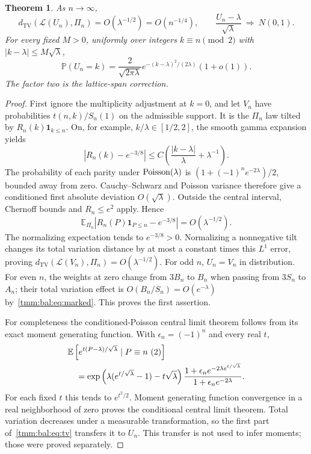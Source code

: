 \documentclass[11pt,letterpaper]{article}
\newtheorem{theorem}{Theorem}[section]
\theoremstyle{remark}\newtheorem{remark}[theorem]{Remark}
\newcommand{\E}{\mathbb E}\newcommand{\Pp}{\mathbb P}
\newcommand{\one}{\mathbf 1}\newcommand{\TV}{d_{\mathrm{TV}}}
\begin{document}
\begin{theorem}\label{tmm:bal:thm:tv}
As $n\to\infty$,
\begin{equation}\label{tmm:bal:eq:tv}
 \TV(\mathcal L(U_n),\Pi_n)=O(\lambda^{-1/2})=O(n^{-1/4}),
 \qquad \frac{U_n-\lambda}{\sqrt\lambda}\ \Longrightarrow\ N(0,1).
\end{equation}
For every fixed $M>0$, uniformly over integers $k\equiv n\pmod2$ with $|k-\lambda|\le M\sqrt\lambda$,
\begin{equation}\label{tmm:bal:eq:local}
 \Pp(U_n=k)=\frac{2}{\sqrt{2\pi\lambda}}
 e^{-(k-\lambda)^2/(2\lambda)}(1+o(1)).
\end{equation}
The factor two is the lattice-span correction.
\end{theorem}
\begin{proof}
First ignore the multiplicity adjustment at $k=0$, and let $V_n$ have probabilities $t(n,k)/S_n(1)$ on the admissible support. It is the $\Pi_n$ law tilted by $R_n(k)\one_{k\le n}$. On, for example, $k/\lambda\in[1/2,2]$, the smooth gamma expansion yields
\[
 |R_n(k)-e^{-3/8}|
   \le C\left(\frac{|k-\lambda|}{\lambda}+\lambda^{-1}\right).
\]
The probability of each parity under $\operatorname{Poisson}(\lambda)$ is
$(1+(-1)^ne^{-2\lambda})/2$, bounded away from zero. Cauchy--Schwarz and Poisson variance therefore give a conditioned first absolute deviation $O(\sqrt\lambda)$. Outside the central interval, Chernoff bounds and $R_n\le e^2$ apply. Hence
\[
 \E_{\Pi_n}|R_n(P)\one_{P\le n}-e^{-3/8}|=O(\lambda^{-1/2}).
\]
The normalizing expectation tends to $e^{-3/8}>0$. Normalizing a nonnegative tilt changes its total variation distance by at most a constant times this $L^1$ error, proving $\TV(\mathcal L(V_n),\Pi_n)=O(\lambda^{-1/2})$. For odd $n$, $U_n=V_n$ in distribution. For even $n$, the weights at zero change from $3B_n$ to $B_n$ when passing from $3S_n$ to $A_n$; their total variation effect is $O(B_n/S_n)=O(e^{-\lambda})$ by~\eqref{tmm:bal:eq:marked}. This proves the first assertion.

For completeness the conditioned-Poisson central limit theorem follows from its exact moment generating function. With $\epsilon_n=(-1)^n$ and every real $t$,
\begin{align}
 &\E\left[e^{t(P-\lambda)/\sqrt\lambda}\mid P\equiv n\ (2)\right]\notag\\
 &\quad=\exp\left(\lambda(e^{t/\sqrt\lambda}-1)-t\sqrt\lambda\right)
 \frac{1+\epsilon_n e^{-2\lambda e^{t/\sqrt\lambda}}}
      {1+\epsilon_n e^{-2\lambda}}.\label{tmm:bal:eq:condmgf}
\end{align}
For each fixed $t$ this tends to $e^{t^2/2}$. Moment generating function convergence in a real neighborhood of zero proves the conditional central limit theorem. Total variation decreases under a measurable transformation, so the first part of~\eqref{tmm:bal:eq:tv} transfers it to $U_n$. This transfer is not used to infer moments; those were proved separately.


\end{proof}
\end{document}
